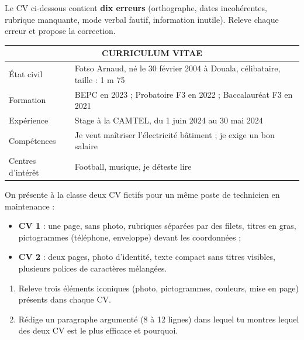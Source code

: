 \documentclass[11pt]{article}
\newcounter{popsec}
\newcounter{popsub}
\newcommand{\courssub}[1]{%
  \stepcounter{popsub}%
  \par\vspace{9pt}\noindent{\popxbold\fontsize{11.5}{13}\selectfont\color{popink}{\color{poporange}\thepopsec.\thepopsub}\hspace{6pt}#1}\par\nopagebreak\vspace{4pt}
}
\begin{document}
\begin{exercice}
Le CV ci-dessous contient \textbf{dix erreurs} (orthographe, dates incohérentes, rubrique manquante, mode verbal fautif, information inutile). Releve chaque erreur et propose la correction.

\begin{center}
\begin{tabularx}{\linewidth}{|l|X|}
\hline
\multicolumn{2}{|c|}{\textbf{CURRICULUM VITAE}} \\
\hline
État civil & Fotso Arnaud, né le 30 février 2004 à Douala, célibataire, taille : 1 m 75 \\
\hline
Formation & BEPC en 2023 ; Probatoire F3 en 2022 ; Baccalauréat F3 en 2021 \\
\hline
Expérience & Stage à la CAMTEL, du 1\ier{} juin 2024 au 30 mai 2024 \\
\hline
Compétences & Je veut maîtriser l'électricité bâtiment ; je exige un bon salaire \\
\hline
Centres d'intérêt & Football, musique, je déteste lire \\
\hline
\end{tabularx}
\end{center}
\end{exercice}

\begin{exercice}
On présente à la classe deux CV fictifs pour un même poste de technicien en maintenance :
\begin{itemize}
\item \textbf{CV 1} : une page, sans photo, rubriques séparées par des filets, titres en gras, pictogrammes (téléphone, enveloppe) devant les coordonnées ;
\item \textbf{CV 2} : deux pages, photo d'identité, texte compact sans titres visibles, plusieurs polices de caractères mélangées.
\end{itemize}

\begin{enumerate}
\item Releve trois éléments iconiques (photo, pictogrammes, couleurs, mise en page) présents dans chaque CV.
\item Rédige un paragraphe argumenté (8 à 12 lignes) dans lequel tu montres lequel des deux CV est le plus efficace et pourquoi.
\end{enumerate}
\end{exercice}

\courssub{Je me prépare au Bac}
\end{document}
